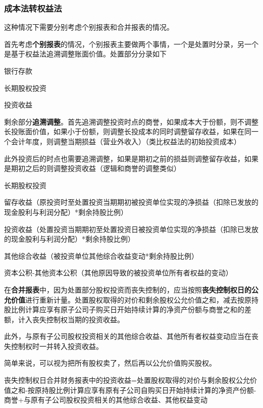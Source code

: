 \documentclass[UTF8,12pt]{ctexart}
\newenvironment{Dr}{%
	\begin{list}{}%
		{
			\setlength{\leftmargin}{2em}
			\setlength{\labelwidth}{2em}
			\setlength{\labelsep}{0pt}
			\setlength{\itemindent}{0pt}
			\setlength{\listparindent}{0pt}
			\setlength{\parsep}{0pt}
			\setlength{\topsep}{0pt}
		}
		\item[\textbf{借：}]
	}{%
	\end{list}
}
\newenvironment{Cr}{%
	\begin{list}{}%
		{
			\setlength{\leftmargin}{3em}
			\setlength{\labelwidth}{2em}
			\setlength{\labelsep}{0pt}
			\setlength{\itemindent}{0pt}
			\setlength{\listparindent}{0pt}
			\setlength{\parsep}{0pt}
			\setlength{\topsep}{0pt}
		}
		\item[\textbf{贷：}]
	}{%
	\end{list}
}
\numberwithin{equation}{section} %
\numberwithin{figure}{section}
\numberwithin{table}{section}
\begin{document}
	
	\subsubsection{成本法转权益法}
	这种情况下需要分别考虑个别报表和合并报表的情况。
	
	首先考虑\textbf{个别报表}的情况，个别报表主要做两个事情，一个是处置时分录，另一个是基于权益法追溯调整账面价值。处置部分分录如下
	
	\begin{Dr}
		银行存款
	\end{Dr}
	\begin{Cr}
		长期股权投资
		
		投资收益
	\end{Cr}
	
	剩余部分\textbf{追溯调整}。首先追溯调整投资时点的商誉，如果成本大于份额，则不调整长投账面价值，如果小于份额，则调整长投成本的同时调整留存收益，如果在同一个会计年度，则调整当期损益（营业外收入）（类比权益法的初始投资成本）
	
	此外投资后的时点也需要追溯调整，如果是期初之前的损益则调整留存收益，如果是期初之后的则调整投资收益（逻辑和商誉的调整类似）
	
	\begin{Dr}
		长期股权投资
	\end{Dr}
	\begin{Cr}
		留存收益（原投资时至处置投资当期期初被投资单位实现的净损益（扣除已发放的现金股利与利润分配）*剩余持股比例）
		
		投资收益（处置投资当期期初至处置投资日被投资单位实现的净损益（扣除已发放的现金股利与利润分配）*剩余持股比例）
		
		其他综合收益（被投资单位其他综合收益变动*剩余持股比例）
		
		资本公积-其他资本公积（其他原因导致的被投资单位所有者权益的变动）
	\end{Cr}
	
	在\textbf{合并报表}中，因为处置部分股权投资而丧失控制的，应当按照\textbf{丧失控制权日的公允价值}进行重新计量。处置股权取得的对价和剩余股权公允价值之和，减去按原持股比例计算应享有原子公司子购买日开始持续计算的净资产份额与商誉之和的差额，计入丧失控制权当期的投资收益。
	
	此外，与原有子公司股权投资相关的其他综合收益、其他所有者权益变动应当在丧失控制权时一并转入投资收益。
	
	简单来说，可以视为把所有股权卖了，然后再以公允价值购买股权。
	
	丧失控制权日合并财务报表中的投资收益=处置股权取得的对价与剩余股权公允价值之和-按原持股比例计算应享有原有子公司自购买日开始持续计算的净资产份额-商誉+与原有子公司股权投资相关的其他综合收益、其他权益变动
	
\end{document}

